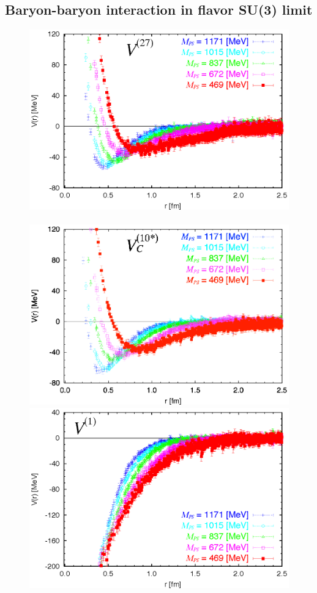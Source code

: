 \subsection{Baryon-baryon interaction in flavor SU(3) limit}
  
\begin{figure}[t]
\begin{center}
\includegraphics[scale=0.55]{Chapter3-figures/Vc_27_npa2.eps}\ \ \ \ \ \ \ 
\includegraphics[scale=0.55]{Chapter3-figures/Vc_10s_npa2.eps}\\
\includegraphics[scale=0.55]{Chapter3-figures/Vc_1_npa2.eps}\ \ \ \ \ \ \ 

\end{center}
\end{figure}
